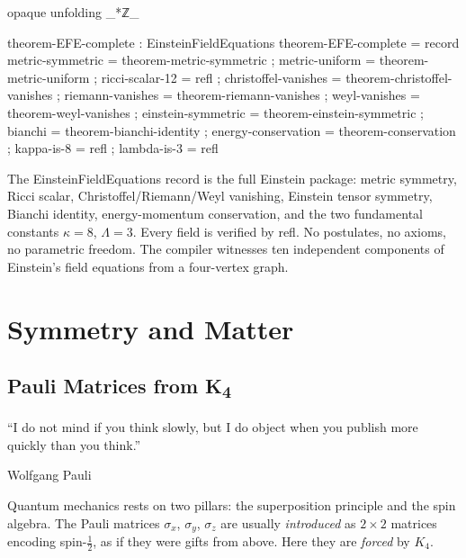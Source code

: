 \documentclass[11pt,a4paper]{book}
\def\texttt#1{#1}%
\begin{document}
\begin{code}
opaque
  unfolding _*ℤ_

  theorem-EFE-complete : EinsteinFieldEquations
  theorem-EFE-complete = record
    { metric-symmetric    = theorem-metric-symmetric
    ; metric-uniform      = theorem-metric-uniform
    ; ricci-scalar-12     = refl
    ; christoffel-vanishes = theorem-christoffel-vanishes
    ; riemann-vanishes    = theorem-riemann-vanishes
    ; weyl-vanishes       = theorem-weyl-vanishes
    ; einstein-symmetric  = theorem-einstein-symmetric
    ; bianchi             = theorem-bianchi-identity
    ; energy-conservation = theorem-conservation
    ; kappa-is-8          = refl
    ; lambda-is-3         = refl }
\end{code}

The \texttt{EinsteinFieldEquations} record is the full Einstein package: metric symmetry, Ricci scalar, Christoffel/Riemann/Weyl vanishing, Einstein tensor symmetry, Bianchi identity, energy-momentum conservation, and the two fundamental constants $\kappa = 8$, $\Lambda = 3$. Every field is verified by \texttt{refl}. No postulates, no axioms, no parametric freedom. The compiler witnesses ten independent components of Einstein's field equations from a four-vertex graph.


\part{Symmetry and Matter}
\label{part:symmetry-matter}

\chapter{Pauli Matrices from K\textsubscript{4}}
\label{ch:pauli-matrices}

\epigraph{``I do not mind if you think slowly, but I do object when you publish more quickly than you think.''}{Wolfgang Pauli}

Quantum mechanics rests on two pillars: the superposition principle and the spin algebra. The Pauli matrices $\sigma_x$, $\sigma_y$, $\sigma_z$ are usually \emph{introduced} as $2 \times 2$ matrices encoding spin-$\frac{1}{2}$, as if they were gifts from above. Here they are \emph{forced} by $K_4$.
\end{document}
